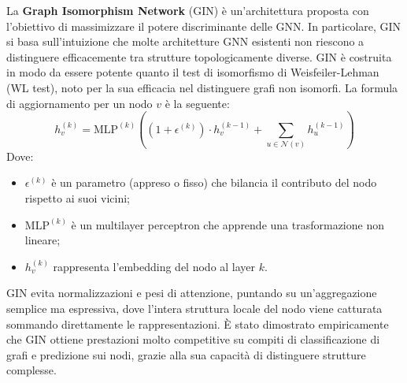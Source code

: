 La \textbf{Graph Isomorphism Network} (GIN) è un'architettura proposta con l’obiettivo di massimizzare il potere discriminante delle GNN. In particolare, GIN si basa sull’intuizione che molte architetture GNN esistenti non riescono a distinguere efficacemente tra strutture topologicamente diverse. GIN è costruita in modo da essere potente quanto il test di isomorfismo di Weisfeiler-Lehman (WL test), noto per la sua efficacia nel distinguere grafi non isomorfi. La formula di aggiornamento per un nodo \( v \) è la seguente:
\[
    h_v^{(k)} = \text{MLP}^{(k)} \left((1 + \epsilon^{(k)}) \cdot h_v^{(k-1)} + \sum_{u \in \mathcal{N}(v)} h_u^{(k-1)} \right)
\]
Dove:
\begin{itemize}
    \item \( \epsilon^{(k)} \) è un parametro (appreso o fisso) che bilancia il contributo del nodo rispetto ai suoi vicini;
    \item \( \text{MLP}^{(k)} \) è un multilayer perceptron che apprende una trasformazione non lineare;
    \item \( h_v^{(k)} \) rappresenta l’embedding del nodo al layer \( k \).
\end{itemize}

GIN evita normalizzazioni e pesi di attenzione, puntando su un'aggregazione semplice ma espressiva, dove l'intera struttura locale del nodo viene catturata sommando direttamente le rappresentazioni. È stato dimostrato empiricamente che GIN ottiene prestazioni molto competitive su compiti di classificazione di grafi e predizione sui nodi, grazie alla sua capacità di distinguere strutture complesse.

